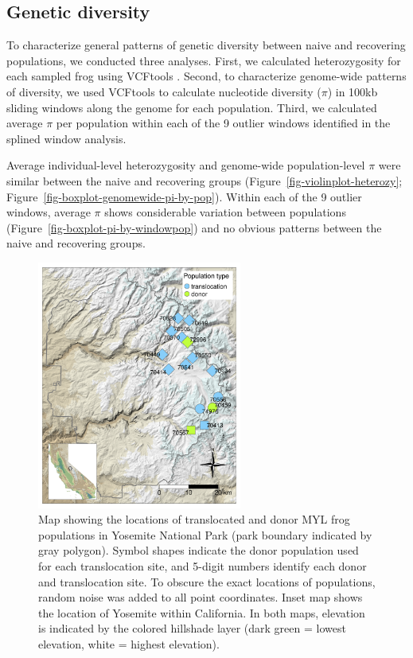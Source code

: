 \documentclass[9pt,twoside,lineno]{pnas-new}
\begin{document}
\hypertarget{genetic-diversity}{%
\subsection{Genetic diversity}\label{genetic-diversity}}

To characterize general patterns of genetic diversity between naive and
recovering populations, we conducted three analyses. First, we
calculated heterozygosity for each sampled frog using VCFtools
\citep{danecek2011}. Second, to characterize genome-wide patterns of
diversity, we used VCFtools to calculate nucleotide diversity (\(\pi\))
in 100kb sliding windows along the genome for each population. Third, we
calculated average \(\pi\) per population within each of the 9 outlier
windows identified in the splined window analysis.

Average individual-level heterozygosity and genome-wide population-level
\(\pi\) were similar between the naive and recovering groups
(Figure~\ref{fig-violinplot-heterozy};
Figure~\ref{fig-boxplot-genomewide-pi-by-pop}). Within each of the 9
outlier windows, average \(\pi\) shows considerable variation between
populations (Figure~\ref{fig-boxplot-pi-by-windowpop}) and no obvious
patterns between the naive and recovering groups.

\newpage

\newpage

\begin{figure}

{\centering \includegraphics[width=0.60\textwidth]{figures/map_translocation_points.png}

}

\caption{\label{fig-yosemap}Map showing the locations of translocated
and donor MYL frog populations in Yosemite National Park (park boundary
indicated by gray polygon). Symbol shapes indicate the donor population
used for each translocation site, and 5-digit numbers identify each
donor and translocation site. To obscure the exact locations of
populations, random noise was added to all point coordinates. Inset map
shows the location of Yosemite within California. In both maps,
elevation is indicated by the colored hillshade layer (dark green =
lowest elevation, white = highest elevation).}

\end{figure}\clearpage
\end{document}
